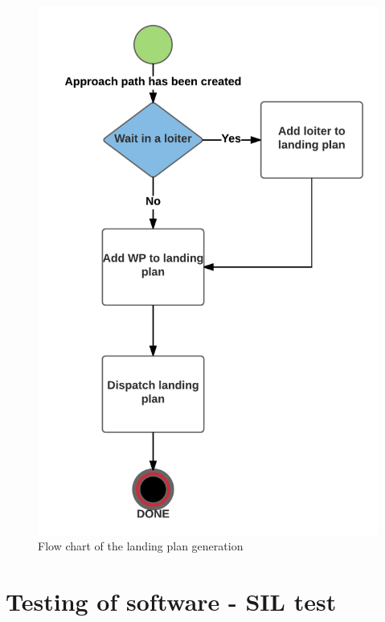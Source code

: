 \begin{figure}[H]
\centering
\includegraphics[scale=0.8]{figs/LandingPath.png}
\caption{Flow chart of the landing plan generation}
\label{Fig:FlowChartLanding}
\end{figure}
\section{Testing of software - SIL test}\label{ss:SILLandingPlan}
